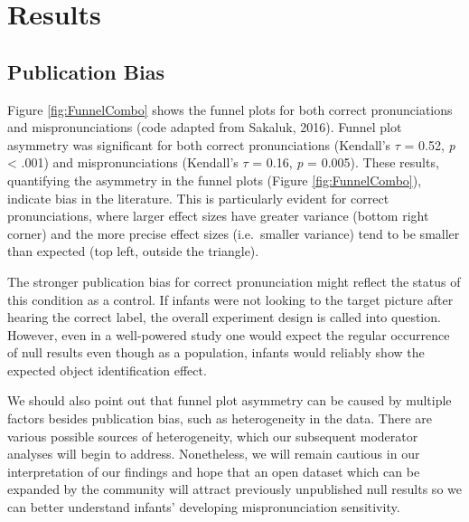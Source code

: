 \documentclass[
  english,
  man, noextraspace]{apa6}
\begin{document}
\hypertarget{results}{%
\section{Results}\label{results}}

\hypertarget{publication-bias-1}{%
\subsection{Publication Bias}\label{publication-bias-1}}

Figure \ref{fig:FunnelCombo} shows the funnel plots for both correct pronunciations and mispronunciations (code adapted from Sakaluk, 2016). Funnel plot asymmetry was significant for both correct pronunciations (Kendall's \(\tau\) = 0.52, \emph{p} \textless{} .001) and mispronunciations (Kendall's \(\tau\) = 0.16, \emph{p} = 0.005). These results, quantifying the asymmetry in the funnel plots (Figure \ref{fig:FunnelCombo}), indicate bias in the literature. This is particularly evident for correct pronunciations, where larger effect sizes have greater variance (bottom right corner) and the more precise effect sizes (i.e.~smaller variance) tend to be smaller than expected (top left, outside the triangle).

The stronger publication bias for correct pronunciation might reflect the status of this condition as a control. If infants were not looking to the target picture after hearing the correct label, the overall experiment design is called into question. However, even in a well-powered study one would expect the regular occurrence of null results even though as a population, infants would reliably show the expected object identification effect.

We should also point out that funnel plot asymmetry can be caused by multiple factors besides publication bias, such as heterogeneity in the data. There are various possible sources of heterogeneity, which our subsequent moderator analyses will begin to address. Nonetheless, we will remain cautious in our interpretation of our findings and hope that an open dataset which can be expanded by the community will attract previously unpublished null results so we can better understand infants' developing mispronunciation sensitivity.
\end{document}
